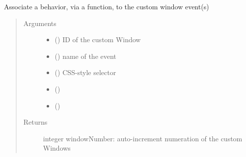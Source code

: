 \documentclass[a4paper,12pt,english]{sphinxmanual}
\begin{document}
\begin{fulllineitems}
\label{\detokenize{viewer/parameters:BIMDataViewer.onCustomWindow}}
Associate a behavior, via a function, to the custom window event(s)
\begin{quote}\begin{description}
\item[{Arguments}] \leavevmode\begin{itemize}
\item {} 
 () \textendash{} ID of the custom Window

\item {} 
 () \textendash{} name of the event

\item {} 
 () \textendash{} CSS-style selector

\item {} 
 () \textendash{} 

\item {} 
 () \textendash{} 

\end{itemize}

\item[{Returns}] \leavevmode
integer windowNumber: auto-increment numeration of the custom Windows

\end{description}\end{quote}

\end{fulllineitems}
\end{document}
